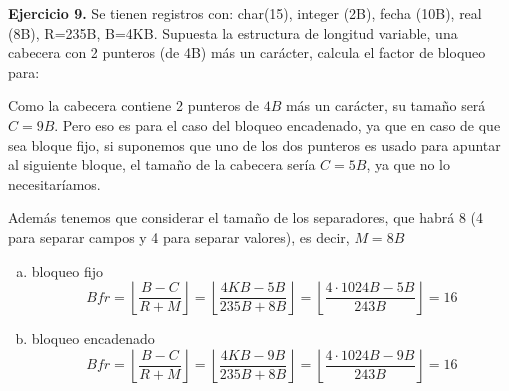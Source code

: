 \documentclass[12pt]{report}
\begin{document}
\textbf{Ejercicio 9.} Se tienen registros con: char(15), integer (2B), fecha (10B), real (8B), R=235B, B=4KB. Supuesta la estructura de longitud variable, una cabecera con 2 punteros (de 4B) más un carácter, calcula el factor de bloqueo para:

Como la cabecera contiene 2 punteros de $4B$ más un carácter, su tamaño será $C=9B$. Pero eso es para el caso del bloqueo encadenado, ya que en caso de que sea bloque fijo, si suponemos que uno de los dos punteros es usado para apuntar al siguiente bloque, el tamaño de la cabecera sería $C=5B$, ya que no lo necesitaríamos. 

Además tenemos que considerar el tamaño de los separadores, que habrá 8 (4 para separar campos y 4 para separar valores), es  decir, $M=8B$

\begin{enumerate}[(a)]
\item bloqueo fijo
\[
Bfr=\left\lfloor\frac{B-C}{R+M}\right\rfloor=\left\lfloor\frac{4KB-5B}{235B+8B}\right\rfloor=\left\lfloor\frac{4\cdot 1024B-5B}{243B}\right\rfloor=16
\]
\item bloqueo encadenado
\[
Bfr=\left\lfloor\frac{B-C}{R+M}\right\rfloor=\left\lfloor\frac{4KB-9B}{235B+8B}\right\rfloor=\left\lfloor\frac{4\cdot 1024B-9B}{243B}\right\rfloor=16
\]\end{enumerate}
\end{document}
